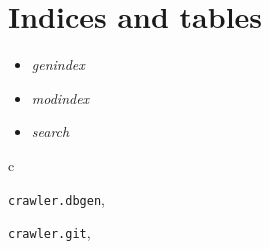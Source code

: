 \documentclass[letterpaper,10pt,english]{sphinxmanual}
\begin{document}
\chapter{Indices and tables}
\label{index:indices-and-tables}\begin{itemize}
\item {} 
\emph{genindex}

\item {} 
\emph{modindex}

\item {} 
\emph{search}

\end{itemize}


\renewcommand{\indexname}{Python Module Index}
\begin{theindex}
\def\bigletter#1{{\Large\sffamily#1}\nopagebreak\vspace{1mm}}
\bigletter{c}
\item {\texttt{crawler.dbgen}}, \pageref{dbgen:module-crawler.dbgen}
\item {\texttt{crawler.git}}, \pageref{git:module-crawler.git}
\end{theindex}

\renewcommand{\indexname}{Index}
\printindex
\end{document}
